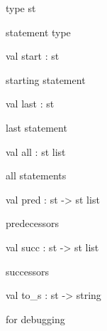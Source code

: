 \documentclass[11pt]{article}
\begin{document}
\begin{ocamldocsigend}


\label{type:Ctrlflow.CTRLFLOW.st}\begin{ocamldoccode}
type st 
\end{ocamldoccode}
\begin{ocamldocdescription}
statement type


\end{ocamldocdescription}


\label{val:Ctrlflow.CTRLFLOW.start}\begin{ocamldoccode}
val start : st
\end{ocamldoccode}
\begin{ocamldocdescription}
starting statement


\end{ocamldocdescription}


\label{val:Ctrlflow.CTRLFLOW.last}\begin{ocamldoccode}
val last : st
\end{ocamldoccode}
\begin{ocamldocdescription}
last statement


\end{ocamldocdescription}


\label{val:Ctrlflow.CTRLFLOW.all}\begin{ocamldoccode}
val all : st list
\end{ocamldoccode}
\begin{ocamldocdescription}
all statements


\end{ocamldocdescription}


\label{val:Ctrlflow.CTRLFLOW.pred}\begin{ocamldoccode}
val pred : st -> st list
\end{ocamldoccode}
\begin{ocamldocdescription}
predecessors


\end{ocamldocdescription}


\label{val:Ctrlflow.CTRLFLOW.succ}\begin{ocamldoccode}
val succ : st -> st list
\end{ocamldoccode}
\begin{ocamldocdescription}
successors


\end{ocamldocdescription}


\label{val:Ctrlflow.CTRLFLOW.to-underscores}\begin{ocamldoccode}
val to_s : st -> string
\end{ocamldoccode}
\begin{ocamldocdescription}
for debugging


\end{ocamldocdescription}
\end{ocamldocsigend}
\end{document}
